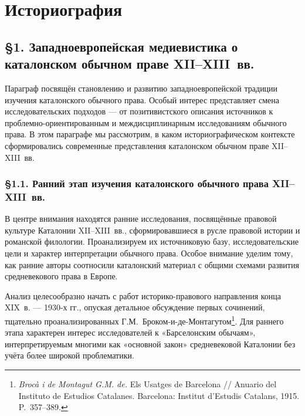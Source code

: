 
\section*{Историография}

\subsection*{§1. Западноевропейская медиевистика о каталонском обычном праве XII--XIII~вв.}

Параграф посвящён становлению и развитию западноевропейской традиции изучения каталонского обычного права. Особый интерес представляет смена исследовательских подходов --- от позитивистского описания источников к проблемно-ориентированным и междисциплинарным исследованиям обычного права. В этом параграфе мы рассмотрим, в каком историографическом контексте сформировались современные представления каталонском обычном праве XII--XIII~вв.

\subsubsection*{§1.1. Ранний этап изучения каталонского обычного права XII--XIII~вв.}

В центре внимания находятся ранние исследования, посвящённые правовой культуре Каталонии XII--XIII~вв., сформировавшиеся в русле правовой истории и романской филологии. Проанализируем их источниковую базу, исследовательские цели и характер интерпретации обычного права. Особое внимание уделим тому, как ранние авторы соотносили каталонский материал с общими схемами развития средневекового права в Европе.

Анализ целесообразно начать с работ историко-правового направления конца XIX~в. --- 1930-х гг., опуская детальное обсуждение первых сочинений, тщательно проанализированных Г.М.~Броком-и-де-Монтагутом\footnote{\emph{Brocà i de Montagut G.M. de.} Els Usatges de Barcelona // Anuario del Instituto de Estudios Catalanes. Barcelona: Institut d'Estudis Catalans, 1915. P.~357--389.}. Для раннего этапа характерен интерес исследователей к «Барселонским обычаям», интерпретируемым многими как «основной закон» средневековой Каталонии без учёта более широкой проблематики.

